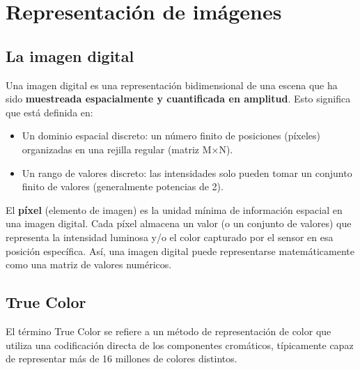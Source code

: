 \section{Representación de imágenes}
\subsection{La imagen digital}
Una imagen digital es una representación bidimensional de una escena que ha sido \textbf{muestreada espacialmente y cuantificada en amplitud}. Esto significa que está definida en:
\begin{itemize}
\item Un dominio espacial discreto: un número finito de posiciones (píxeles) organizadas en una rejilla regular (matriz M×N).
\item Un rango de valores discreto: las intensidades solo pueden tomar un conjunto finito de valores (generalmente potencias de 2).
\end{itemize}

El \textbf{píxel} (elemento de imagen) es la unidad mínima de información espacial en una imagen digital. Cada píxel almacena un valor (o un conjunto de valores) que representa la intensidad luminosa y/o el color capturado por el sensor en esa posición específica. Así, una imagen digital puede representarse matemáticamente como una matriz de valores numéricos.

\subsection{True Color}
El término True Color se refiere a un método de representación de color que utiliza una codificación directa de los componentes cromáticos, típicamente capaz de representar más de 16 millones de colores distintos.

